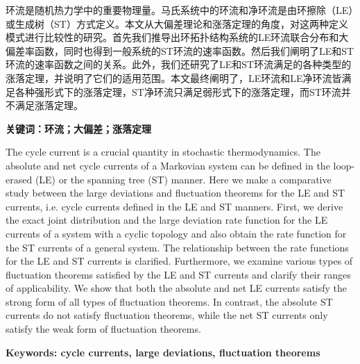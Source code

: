 
\setcounter{page}{1}
\song{}

环流是随机热力学中的重要物理量。马氏系统中的环流和净环流是由环擦除（LE）或生成树（ST）方式定义。本文从大偏差理论和涨落定理的角度，对这两种定义模式进行比较性的研究。首先我们推导出环拓扑结构系统的LE环流联合分布和大偏差率函数，同时也得到一般系统的ST环流的速率函数。然后我们阐明了LE和ST环流的速率函数之间的关系。此外，我们还研究了LE和ST环流满足的各种类型的涨落定理，并说明了它们的适用范围。本文最终阐明了，LE环流和LE净环流皆满足各种强形式下的涨落定理，ST净环流只满足弱形式下的涨落定理，而ST环流并不满足涨落定理。

\vspace{\baselineskip}

\hangindent=52.3pt\noindent
{\bfseries\xiaosi\song 关键词：环流；大偏差；涨落定理}
\clearpage


The cycle current is a crucial quantity in stochastic thermodynamics. The absolute and net cycle currents of a Markovian system can be defined in the loop-erased (LE) or the spanning tree (ST) manner. Here we make a comparative study between the large deviations and fluctuation theorems for the LE and ST currents, i.e. cycle currents defined in the LE and ST manners. First, we derive the exact joint distribution and the large deviation rate function for the LE currents of a system with a cyclic topology and also obtain the rate function for the ST currents of a general system. The relationship between the rate functions for the LE and ST currents is clarified. Furthermore, we examine various types of fluctuation theorems satisfied by the LE and ST currents and clarify their ranges of applicability. We show that both the absolute and net LE currents satisfy the strong form of all types of fluctuation theorems. In contrast, the absolute ST currents do not satisfy fluctuation theorems, while the net ST currents only satisfy the weak form of fluctuation theorems.

\vspace{\baselineskip}

\hangindent=60pt\noindent
{\textbf{\xiaosi Keywords: cycle currents, large deviations, fluctuation theorems}}
\clearpage
